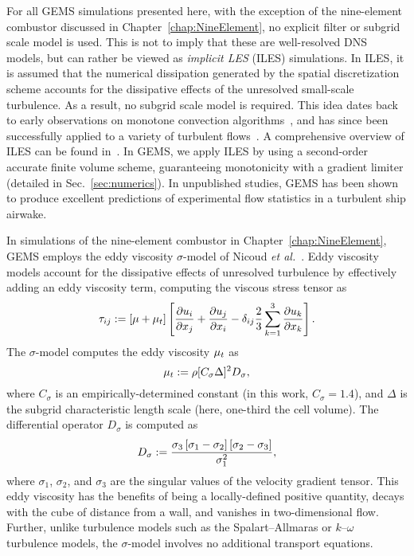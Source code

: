 For all GEMS simulations presented here, with the exception of the nine-element combustor discussed in Chapter~\ref{chap:NineElement}, no explicit filter or subgrid scale model is used. This is not to imply that these are well-resolved DNS models, but can rather be viewed as \textit{implicit LES} (ILES) simulations. In ILES, it is assumed that the numerical dissipation generated by the spatial discretization scheme accounts for the dissipative effects of the unresolved small-scale turbulence. As a result, no subgrid scale model is required. This idea dates back to early observations on monotone convection algorithms~\cite{Boris1989}, and has since been successfully applied to a variety of turbulent flows~\cite{Porter1994,Grinstein2005,Bensow2010}. A comprehensive overview of ILES can be found in~\cite{ilesBook}. In GEMS, we apply ILES by using a second-order accurate finite volume scheme, guaranteeing monotonicity with a gradient limiter (detailed in Sec.~\ref{sec:numerics}). In unpublished studies, GEMS has been shown to produce excellent predictions of experimental flow statistics in a turbulent ship airwake.

In simulations of the nine-element combustor in Chapter~\ref{chap:NineElement}, GEMS employs the eddy viscosity $\sigma$-model of Nicoud \textit{et al.}~\cite{Nicoud2011}. Eddy viscosity models account for the dissipative effects of unresolved turbulence by effectively adding an eddy viscosity term, computing the viscous stress tensor as
%
\begin{equation}
	\tau_{i j} := \left[\mu + \mu_{t}\right] \left[ \frac{\partial u_{i}}{\partial x_{j}} + \frac{\partial u_{j}}{\partial x_{i}} - \delta_{i j} \frac{2}{3} \sum_{k=1}^3 \frac{\partial u_{k}}{\partial x_{k}} \right].
\end{equation}
%
The $\sigma$-model computes the eddy viscosity $\mu_{t}$ as
%
\begin{equation}
	\mu_{t} := \rho [C_{\sigma} \Delta]^2 D_{\sigma},
\end{equation}
%
where $C_{\sigma}$ is an empirically-determined constant (in this work, $C_{\sigma} = 1.4$), and $\Delta$ is the subgrid characteristic length scale (here, one-third the cell volume). The differential operator $D_{\sigma}$ is computed as
%
\begin{equation}
	D_{\sigma} := \frac{\sigma_3\left[\sigma_1 - \sigma_2\right]\left[\sigma_2 - \sigma_3\right]}{\sigma_1^2},
\end{equation}
%
where $\sigma_1$, $\sigma_2$, and $\sigma_3$ are the singular values of the velocity gradient tensor. This eddy viscosity has the benefits of being a locally-defined positive quantity, decays with the cube of distance from a wall, and vanishes in two-dimensional flow. Further, unlike turbulence models such as the Spalart--Allmaras or $k$--$\omega$ turbulence models, the $\sigma$-model involves no additional transport equations.


